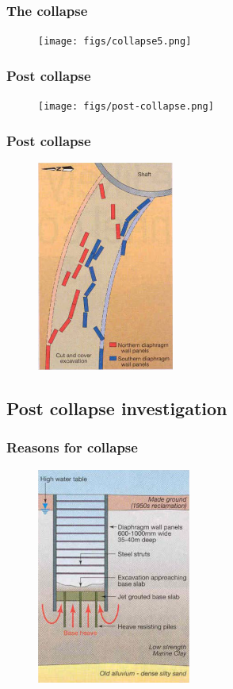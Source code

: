 \documentclass[handout]{beamer}
\begin{document}
\begin{frame}
\frametitle{The collapse}
\begin{figure}[ht]
	\centering
	\texttt{[image: figs/collapse5.png]}
\end{figure}
\end{frame}

\begin{frame}
\frametitle{Post collapse}
\begin{figure}[ht]
	\centering
	\texttt{[image: figs/post-collapse.png]}
\end{figure}
\end{frame}

\begin{frame}
\frametitle{Post collapse}
\begin{figure}[ht]
	\centering
	\includegraphics[width=0.4\textwidth]{figs/final-dwall-panels.png}
\end{figure}
\end{frame}

\subsection{Post collapse investigation}
\begin{frame}
\frametitle{Reasons for collapse}
\begin{figure}[ht]
	\centering
	\includegraphics[width=0.45\textwidth]{figs/reasons-collapse.png}
\end{figure}
\end{frame}
\end{document}
